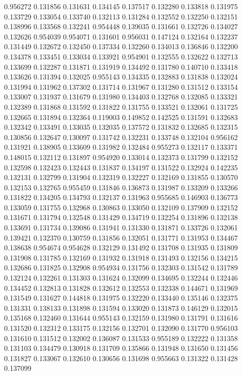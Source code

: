 0.956272
0.131856
0.131631
0.134145
0.137517
0.132280
0.133818
0.131975
0.133729
0.133054
0.133740
0.132113
0.131284
0.132552
0.132250
0.132151
0.138996
0.133568
0.132241
0.954448
0.139035
0.131661
0.132726
0.134027
0.132626
0.954039
0.954071
0.131601
0.956031
0.147124
0.132164
0.132237
0.131449
0.132672
0.132450
0.137334
0.132260
0.134013
0.136846
0.132200
0.134378
0.133451
0.133034
0.133921
0.954901
0.132555
0.132622
0.132713
0.133699
0.132287
0.131871
0.131919
0.134492
0.131780
0.140710
0.133418
0.133626
0.131394
0.132025
0.955143
0.134335
0.132883
0.131838
0.132024
0.131994
0.131962
0.137302
0.131714
0.131967
0.131280
0.131512
0.133154
0.133007
0.131937
0.131679
0.131980
0.134403
0.132768
0.132085
0.133321
0.132389
0.131868
0.131592
0.131822
0.131755
0.133521
0.132061
0.131725
0.132665
0.131894
0.132364
0.119003
0.149852
0.142525
0.131591
0.132683
0.132342
0.133491
0.133035
0.132035
0.137572
0.131832
0.132685
0.132315
0.130856
0.132647
0.130097
0.131742
0.132231
0.133748
0.132104
0.956162
0.131921
0.138905
0.133609
0.131982
0.132484
0.955273
0.132117
0.133371
0.148015
0.132112
0.131897
0.954920
0.133014
0.132373
0.131799
0.132152
0.132598
0.132423
0.132443
0.131837
0.134197
0.131522
0.132924
0.142235
0.132131
0.132799
0.131904
0.132319
0.132227
0.132169
0.131855
0.130570
0.132153
0.132765
0.955459
0.131846
0.136873
0.131987
0.133209
0.133266
0.131822
0.134205
0.134793
0.132137
0.131963
0.955685
0.146903
0.136773
0.133059
0.131755
0.132968
0.130863
0.133050
0.132109
0.137909
0.132152
0.131671
0.131794
0.132548
0.131429
0.134719
0.132254
0.131896
0.132138
0.133691
0.131734
0.139086
0.131941
0.131330
0.131871
0.133726
0.132061
0.139421
0.132370
0.130759
0.131856
0.132051
0.131771
0.131953
0.134467
0.138638
0.954674
0.954628
0.132129
0.131492
0.131708
0.131935
0.131809
0.131908
0.131785
0.132169
0.131932
0.131918
0.131493
0.132156
0.134215
0.132686
0.131825
0.132908
0.954934
0.131756
0.132303
0.131542
0.131789
0.132124
0.132261
0.131303
0.131624
0.132099
0.134695
0.132244
0.132446
0.134452
0.132813
0.131828
0.132612
0.132553
0.132338
0.144671
0.131969
0.131549
0.131627
0.144818
0.131975
0.132220
0.133440
0.135146
0.132375
0.131331
0.138133
0.131898
0.131594
0.133020
0.131873
0.146129
0.132015
0.135168
0.132460
0.131644
0.955143
0.132159
0.131980
0.131791
0.131616
0.131520
0.132312
0.133175
0.132156
0.132701
0.132090
0.131770
0.956103
0.131610
0.131512
0.132002
0.136087
0.131533
0.955189
0.132222
0.131358
0.131103
0.134479
0.130918
0.131709
0.135866
0.131948
0.131650
0.131456
0.131827
0.133067
0.132610
0.130656
0.131698
0.955663
0.131322
0.131428
0.137099
